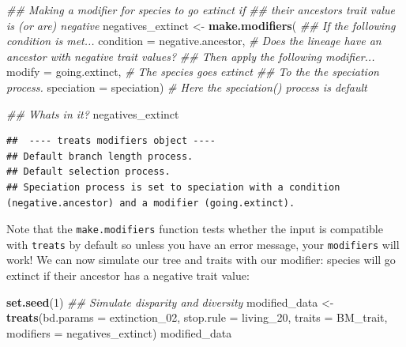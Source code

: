 \documentclass[
]{book}
\newenvironment{Shaded}{\begin{snugshade}}{\end{snugshade}}
\newcommand{\CommentTok}[1]{\textcolor[rgb]{0.56,0.35,0.01}{\textit{#1}}}
\newcommand{\DataTypeTok}[1]{\textcolor[rgb]{0.13,0.29,0.53}{#1}}
\newcommand{\DecValTok}[1]{\textcolor[rgb]{0.00,0.00,0.81}{#1}}
\newcommand{\KeywordTok}[1]{\textcolor[rgb]{0.13,0.29,0.53}{\textbf{#1}}}
\newcommand{\NormalTok}[1]{#1}
\newcommand{\StringTok}[1]{\textcolor[rgb]{0.31,0.60,0.02}{#1}}
\begin{document}
\begin{Shaded}
\begin{Highlighting}[]
\CommentTok{\#\# Making a modifier for species to go extinct if}
\CommentTok{\#\# their ancestor\textquotesingle{}s trait value is (or are) negative}
\NormalTok{negatives\_extinct \textless{}{-}}\StringTok{ }\KeywordTok{make.modifiers}\NormalTok{(}
            \CommentTok{\#\# If the following condition is met...}
            \DataTypeTok{condition =}\NormalTok{ negative.ancestor, }\CommentTok{\# Does the lineage have an ancestor with negative trait values?}
            \CommentTok{\#\# Then apply the following modifier...}
            \DataTypeTok{modify =}\NormalTok{ going.extinct, }\CommentTok{\# The species goes extinct}
            \CommentTok{\#\# To the the speciation process.}
            \DataTypeTok{speciation =}\NormalTok{ speciation) }\CommentTok{\# Here the speciation() process is default}

\CommentTok{\#\# What\textquotesingle{}s in it?}
\NormalTok{negatives\_extinct}
\end{Highlighting}
\end{Shaded}

\begin{verbatim}
##  ---- treats modifiers object ---- 
## Default branch length process.
## Default selection process.
## Speciation process is set to speciation with a condition (negative.ancestor) and a modifier (going.extinct).
\end{verbatim}

Note that the \texttt{make.modifiers} function tests whether the input is compatible with \texttt{treats} by default so unless you have an error message, your \texttt{modifiers} will work!
We can now simulate our tree and traits with our modifier: species will go extinct if their ancestor has a negative trait value:

\begin{Shaded}
\begin{Highlighting}[]
\KeywordTok{set.seed}\NormalTok{(}\DecValTok{1}\NormalTok{)}
\CommentTok{\#\# Simulate disparity and diversity}
\NormalTok{modified\_data \textless{}{-}}\StringTok{ }\KeywordTok{treats}\NormalTok{(}\DataTypeTok{bd.params =}\NormalTok{ extinction\_}\DecValTok{02}\NormalTok{,}
                        \DataTypeTok{stop.rule =}\NormalTok{ living\_}\DecValTok{20}\NormalTok{,}
                        \DataTypeTok{traits    =}\NormalTok{ BM\_trait,}
                        \DataTypeTok{modifiers =}\NormalTok{ negatives\_extinct)}
\NormalTok{modified\_data}
\end{Highlighting}
\end{Shaded}
\end{document}
